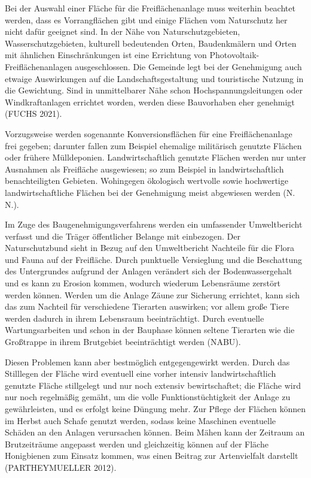 \documentclass[11pt]{scrartcl}
\begin{document}
Bei der Auswahl einer Fläche für die Freiflächenanlage muss weiterhin beachtet werden, dass es Vorrangflächen gibt und einige Flächen vom Naturschutz her nicht dafür geeignet sind.
 In der Nähe von Naturschutzgebieten, Wasserschutzgebieten, kulturell bedeutenden Orten, Baudenkmälern und Orten mit ähnlichen Einschränkungen ist eine Errichtung von Photovoltaik-Freiflächenanlagen ausgeschlossen.
 Die Gemeinde legt bei der Genehmigung auch etwaige Auswirkungen auf die Landschaftsgestaltung und touristische Nutzung in die Gewichtung.
 Sind in unmittelbarer Nähe schon Hochspannungsleitungen oder Windkraftanlagen errichtet worden, werden diese Bauvorhaben eher genehmigt (FUCHS 2021).

Vorzugsweise werden sogenannte Konversionsflächen für eine Freiflächenanlage frei gegeben; darunter fallen zum Beispiel ehemalige militärisch genutzte Flächen oder frühere Mülldeponien.
 Landwirtschaftlich genutzte Flächen werden nur unter Ausnahmen als Freifläche ausgewiesen; so zum Beispiel in landwirtschaftlich benachteiligten Gebieten.
 Wohingegen ökologisch wertvolle sowie hochwertige landwirtschaftliche Flächen bei der Genehmigung meist abgewiesen werden (N. N.).
 
Im Zuge des Baugenehmigungsverfahrens werden ein umfassender Umweltbericht verfasst und die Träger öffentlicher Belange mit einbezogen.
 Der Naturschutzbund sieht in Bezug auf den Umweltbericht Nachteile für die Flora und Fauna auf der Freifläche.
 Durch punktuelle Versieglung und die Beschattung des Untergrundes aufgrund der Anlagen verändert sich der Bodenwassergehalt und es kann zu Erosion kommen, wodurch wiederum Lebensräume zerstört werden können.
 Werden um die Anlage Zäune zur Sicherung errichtet, kann sich das zum Nachteil für verschiedene Tierarten auswirken; vor allem große Tiere werden dadurch in ihrem Lebensraum beeinträchtigt.
 Durch eventuelle Wartungsarbeiten und schon in der Bauphase können seltene Tierarten wie die Großtrappe in ihrem Brutgebiet beeinträchtigt werden (NABU).
 
Diesen Problemen kann aber bestmöglich entgegengewirkt werden.
 Durch das Stilllegen der Fläche wird eventuell eine vorher intensiv landwirtschaftlich genutzte Fläche stillgelegt und nur noch extensiv bewirtschaftet; die Fläche wird nur noch regelmäßig gemäht, um die volle Funktionstüchtigkeit der Anlage zu gewährleisten, und es erfolgt keine Düngung mehr.
 Zur Pflege der Flächen können im Herbst auch Schafe genutzt werden, sodass keine Maschinen eventuelle Schäden an den Anlagen verursachen können.
 Beim Mähen kann der Zeitraum an Brutzeiträume angepasst werden und gleichzeitig können auf der Fläche Honigbienen zum Einsatz kommen, was einen Beitrag zur Artenvielfalt darstellt (PARTHEYMUELLER 2012).
 
\end{document}
